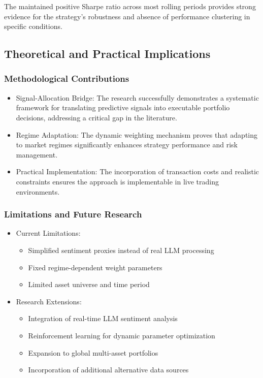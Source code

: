 \documentclass{singlecol-new}
\theoremstyle{TH}{
\newtheorem{lemma}{Lemma}
\newtheorem{theorem}[lemma]{Theorem}
\newtheorem{corrolary}[lemma]{Corrolary}
\newtheorem{conjecture}[lemma]{Conjecture}
\newtheorem{proposition}[lemma]{Proposition}
\newtheorem{claim}[lemma]{Claim}
\newtheorem{stheorem}[lemma]{Wrong Theorem}
\newtheorem{algorithm}{Algorithm}
}
\theoremstyle{THrm}{
\newtheorem{definition}{Definition}[section]
\newtheorem{question}{Question}[section]
\newtheorem{remark}{Remark}
\newtheorem{scheme}{Scheme}
}
\theoremstyle{THhit}{
\newtheorem{case}{Case}[section]
}
\begin{document}
The maintained positive Sharpe ratio across most rolling periods provides strong evidence for the strategy's robustness and absence of performance clustering in specific conditions.

\subsection{Theoretical and Practical Implications}
\subsubsection{Methodological Contributions}
\begin{itemize}
    \item Signal-Allocation Bridge: The research successfully demonstrates a systematic framework for translating predictive signals into executable portfolio decisions, addressing a critical gap in the literature.
    \item Regime Adaptation: The dynamic weighting mechanism proves that adapting to market regimes significantly enhances strategy performance and risk management.
    \item Practical Implementation: The incorporation of transaction costs and realistic constraints ensures the approach is implementable in live trading environments.
\end{itemize}

\subsubsection{Limitations and Future Research}

\begin{itemize}
    \item Current Limitations:
    \begin{itemize}
        \item Simplified sentiment proxies instead of real LLM processing
        \item Fixed regime-dependent weight parameters
        \item Limited asset universe and time period
    \end{itemize}
        
    \item Research Extensions:
    \begin{itemize}
        \item Integration of real-time LLM sentiment analysis
        \item Reinforcement learning for dynamic parameter optimization
        \item  Expansion to global multi-asset portfolios
        \item Incorporation of additional alternative data sources
    \end{itemize}       
\end{itemize}
\end{document}
